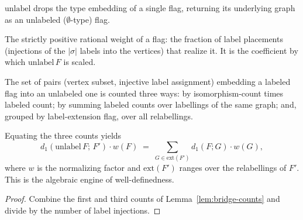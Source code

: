 \begin{definition}[Unlabel]
  \label{def:unlabel}
  \leanok
  $\mathrm{unlabel}$ drops the type embedding of a single flag, returning its
  underlying graph as an unlabeled ($\emptyset$-type) flag.
\end{definition}

\begin{definition}
  \label{def:downward-factor}
  \leanok
  The strictly positive rational weight of a flag: the fraction of label
  placements (injections of the $|\sigma|$ labels into the vertices) that realize
  it. It is the coefficient by which $\mathrm{unlabel}\,F$ is scaled.
\end{definition}

\begin{lemma}
  \label{lem:bridge-counts}
  \leanok
  The set of pairs (vertex subset, injective label assignment) embedding a
  labeled flag into an unlabeled one is counted three ways: by
  isomorphism-count times labeled count; by summing labeled counts over labellings
  of the same graph; and, grouped by label-extension flag, over all relabellings.
\end{lemma}

\begin{theorem}
  \label{thm:counting-identity}
  \leanok
  Equating the three counts yields
  \[ d_1(\mathrm{unlabel}\,F;\,F')\cdot w(F)
     \;=\; \sum_{G \in \mathrm{ext}(F')} d_1(F;G)\cdot w(G), \]
  where $w$ is the normalizing factor and $\mathrm{ext}(F')$ ranges over the
  relabellings of $F'$. This is the algebraic engine of well-definedness.
\end{theorem}
\begin{proof}\leanok
  Combine the first and third counts of Lemma~\ref{lem:bridge-counts} and divide
  by the number of label injections.
\end{proof}

